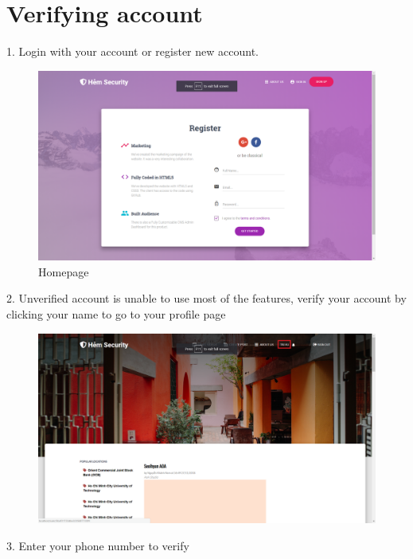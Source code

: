 \section{Verifying account}
1. Login with your account or register new account. 
\begin{center}
	\begin{figure}[H]
		\centering
		\includegraphics[width=1\columnwidth]{images/chap6/instruction1.png}
		\caption{Homepage}
		\label{}
	\end{figure}
\end{center}
\vspace{-1cm}
2. Unverified account is unable to use most of the features, verify your account by clicking your name to go to your profile page
\begin{center}
	\begin{figure}[H]
		\centering
		\includegraphics[width=1\columnwidth]{images/chap6/instruction2.png}
	\end{figure}
\end{center}
3. Enter your phone number to verify
